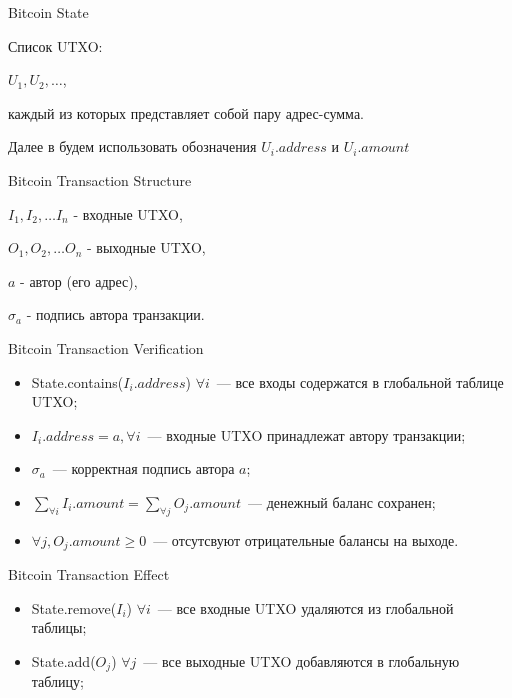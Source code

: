 \documentclass{article}
\begin{document}
\begin{algorithm}
\begin{algorithmic}
\caption{Bitcoin State}
\item Список UTXO:
\item $U_1, U_2, \ldots$,
\item каждый из которых представляет собой пару адрес-сумма.
\item Далее в будем использовать обозначения $U_i.address$ и $U_i.amount$

\end{algorithmic}
\end{algorithm}

\begin{algorithm}
\begin{algorithmic}
\caption{Bitcoin Transaction Structure}
\item $I_1, I_2, \ldots I_n$ - входные UTXO,
\item $O_1, O_2, \ldots O_n$ - выходные UTXO,
\item $a$ - автор (его адрес),
\item $\sigma_a$ - подпись автора транзакции.
\end{algorithmic}
\end{algorithm}

\begin{algorithm}
\caption{Bitcoin Transaction Verification}
\begin{itemize}
  \item
  State.contains($I_i.address$) $\forall i$~--- все входы содержатся в глобальной таблице UTXO;
  \item
  $I_i.address = a, \forall i$~--- входные UTXO принадлежат автору транзакции;
  \item
   $\sigma_a$~--- корректная подпись автора $a$;
  \item
  $\sum_{\forall i} {I_i.amount} = \sum_{\forall j} {O_j.amount}$~--- денежный баланс сохранен;
  \item
  $ \forall j, O_j.amount \ge 0$~--- отсутсвуют отрицательные балансы на выходе.
\end{itemize}
\end{algorithm}

\begin{algorithm}
\caption{Bitcoin Transaction Effect}
\begin{itemize}
  \item
  State.remove($I_i$) $\forall i$~--- все входные UTXO удаляются из глобальной таблицы;
  \item
  State.add($O_j$) $\forall j$~--- все выходные UTXO добавляются в глобальную таблицу;
\end{itemize}
\end{algorithm}
\end{document}
